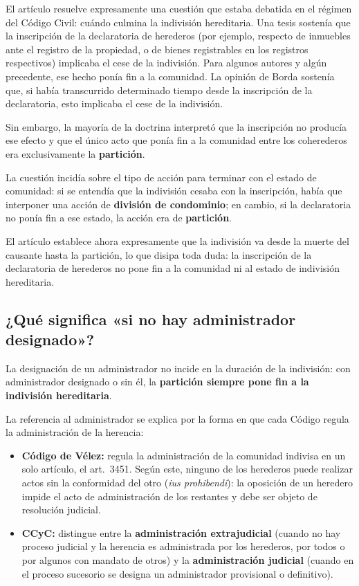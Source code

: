 \documentclass[12pt,oneside]{book}
\begin{document}
El artículo resuelve expresamente una cuestión que estaba debatida en el régimen del Código Civil: cuándo culmina la indivisión hereditaria. Una tesis sostenía que la inscripción de la declaratoria de herederos (por ejemplo, respecto de inmuebles ante el registro de la propiedad, o de bienes registrables en los registros respectivos) implicaba el cese de la indivisión. Para algunos autores y algún precedente, ese hecho ponía fin a la comunidad. La opinión de Borda sostenía que, si había transcurrido determinado tiempo desde la inscripción de la declaratoria, esto implicaba el cese de la indivisión.

Sin embargo, la mayoría de la doctrina interpretó que la inscripción no producía ese efecto y que el único acto que ponía fin a la comunidad entre los coherederos era exclusivamente la \textbf{partición}.

La cuestión incidía sobre el tipo de acción para terminar con el estado de comunidad: si se entendía que la indivisión cesaba con la inscripción, había que interponer una acción de \textbf{división de condominio}; en cambio, si la declaratoria no ponía fin a ese estado, la acción era de \textbf{partición}.

\begin{important}
El artículo establece ahora expresamente que la indivisión va desde la muerte del causante hasta la partición, lo que disipa toda duda: la inscripción de la declaratoria de herederos no pone fin a la comunidad ni al estado de indivisión hereditaria.
\end{important}

\subsection{¿Qué significa «si no hay administrador designado»?}

La designación de un administrador no incide en la duración de la indivisión: con administrador designado o sin él, la \textbf{partición siempre pone fin a la indivisión hereditaria}.

La referencia al administrador se explica por la forma en que cada Código regula la administración de la herencia:

\begin{itemize}
    \item \textbf{Código de Vélez:} regula la administración de la comunidad indivisa en un solo artículo, el art.~3451. Según este, ninguno de los herederos puede realizar actos sin la conformidad del otro (\emph{ius prohibendi}): la oposición de un heredero impide el acto de administración de los restantes y debe ser objeto de resolución judicial.
    \item \textbf{CCyC:} distingue entre la \textbf{administración extrajudicial} (cuando no hay proceso judicial y la herencia es administrada por los herederos, por todos o por algunos con mandato de otros) y la \textbf{administración judicial} (cuando en el proceso sucesorio se designa un administrador provisional o definitivo).
\end{itemize}
\end{document}
